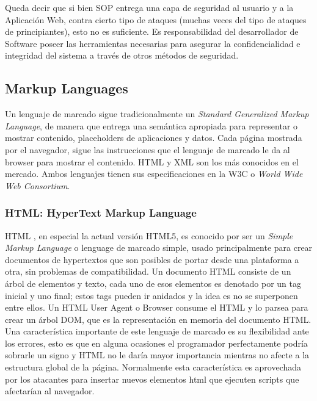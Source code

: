     Queda decir que si bien SOP entrega una capa de seguridad al usuario y a la Aplicación Web, contra cierto tipo de ataques (muchas veces del tipo de ataques de principiantes), esto no es suficiente. Es responsabilidad del desarrollador de Software poseer las herramientas necesarias para asegurar la confidencialidad e integridad del sistema a través de otros métodos de seguridad.
    


    \subsection{Markup Languages}
    \label{chap2:markup}
        Un lenguaje de marcado sigue tradicionalmente un \textit{Standard Generalized Markup Language}, de manera que entrega una semántica apropiada para representar o mostrar contenido, placeholders de aplicaciones y datos. Cada página mostrada por el navegador, sigue las instrucciones que el lenguaje de marcado le da al browser para mostrar el contenido. HTML y XML son los más conocidos en el mercado. Ambos lenguajes tienen sus especificaciones en la W3C o \textit{World Wide Web Consortium}.

        \subsubsection{HTML: HyperText Markup Language}
        \label{chap2:HTML}
        HTML \cite{htmlSpec}, en especial la actual versión HTML5, es conocido por ser un \textit{Simple Markup Language} o lenguage de marcado simple, usado principalmente para crear documentos de hypertextos que son posibles de portar desde una plataforma a otra, sin problemas de compatibilidad. Un documento HTML consiste de un árbol de elementos y texto, cada uno de esos elementos es denotado por un tag inicial y uno final; estos tags pueden ir anidados y la idea es no se superponen entre ellos. Un HTML User Agent o Browser consume el HTML y lo parsea para crear un árbol DOM, que es la representación en memoria del documento HTML.
        Una característica importante de este lenguaje de marcado es su flexibilidad ante los errores, esto es que en alguna ocasiones el programador perfectamente podría sobrarle un signo y HTML no le daría mayor importancia mientras no afecte a la estructura global de la página. Normalmente esta característica es aprovechada por los atacantes para insertar nuevos elementos html que ejecuten scripts que afectarían al navegador.


